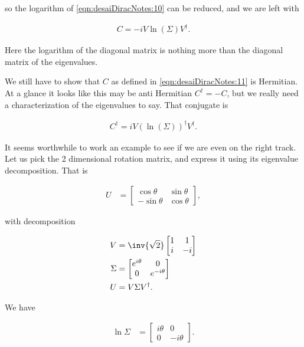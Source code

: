 so the logarithm of \ref{eqn:desaiDiracNotes:10} can be reduced, and we are left with

\begin{align}\label{eqn:desaiDiracNotes:11}
C = -i V \ln ( \Sigma ) V^\dagger.
\end{align}

Here the logarithm of the diagonal matrix is nothing more than the diagonal matrix of the eigenvalues.

We still have to show that $C$ as defined in \ref{eqn:desaiDiracNotes:11} is Hermitian.  At a glance it looks like this may be anti Hermitian $C^\dagger = -C$, but we really need a characterization of the eigenvalues to say.  That conjugate is

\begin{align}\label{eqn:desaiDiracNotes:11b}
C^\dagger = i V (\ln ( \Sigma ))^\dagger V^\dagger.
\end{align}

It seems worthwhile to work an example to see if we are even on the right track.  Let us pick the 2 dimensional rotation matrix, and express it using its eigenvalue decomposition.  That is

\begin{align}\label{eqn:desaiDiracNotes:12}
U &= 
\begin{bmatrix}
\cos\theta & \sin\theta \\
-\sin\theta & \cos\theta
\end{bmatrix},
\end{align}

with decomposition

\begin{align}\label{eqn:desaiDiracNotes:12b}
V &= \inv{\sqrt{2}} 
\begin{bmatrix}
1 & 1 \\
i & -i \\
\end{bmatrix} \\
\Sigma &= 
\begin{bmatrix}
e^{i\theta} & 0 \\
0 & e^{-i\theta} 
\end{bmatrix} \\
U &= V \Sigma V^\dagger.
\end{align}

We have

\begin{align*}
\ln \Sigma &=
\begin{bmatrix}
i\theta & 0 \\
0 & -i\theta 
\end{bmatrix}.
\end{align*}

